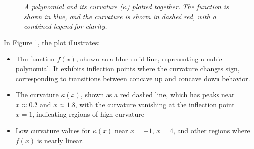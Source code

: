 \begin{figure}[H]
    \centering
{}


    \caption{\textit{A polynomial and its curvature (\(\kappa\)) plotted together. The function is shown in blue, and the curvature is shown in dashed red, with a combined legend for clarity.}}
    \label{fig:fun_curvature}
\end{figure}



\noindent In Figure \ref{fig:fun_curvature}, the plot illustrates:
\begin{itemize}
    \item The function \(f(x)\), shown as a blue solid line, representing a cubic polynomial. It exhibits inflection points where the curvature changes sign, corresponding to transitions between concave up and concave down behavior.
    \item The curvature \(\kappa(x)\), shown as a red dashed line, which has peaks near \(x \approx 0.2\) and \(x \approx 1.8\), with the curvature vanishing at the inflection point \(x = 1\), indicating regions of high curvature.
    \item Low curvature values for \(\kappa(x)\) near \(x = -1\), \(x = 4\), and other regions where \(f(x)\) is nearly linear.
\end{itemize}

